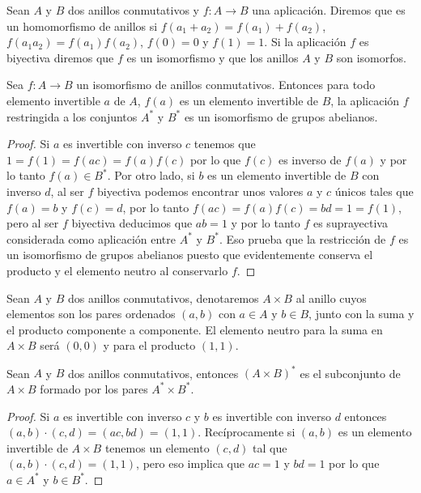 \begin{definition}
Sean $A$ y $B$ dos anillos conmutativos y $f:A \to B$ una aplicaci\'on.
Diremos que es un homomorfismo de anillos si $f(a_1 + a_2) = f(a_1) +
f(a_2)$, $f(a_1 a_2) = f(a_1) f(a_2)$, $f(0) = 0$ y $f(1) = 1$. Si la
aplicaci\'on $f$ es biyectiva diremos que $f$ es un isomorfismo y que los
anillos $A$ y $B$ son isomorfos.
\end{definition}

\begin{proposition}
Sea $f:A \to B$ un isomorfismo de anillos conmutativos. Entonces para todo
elemento invertible $a$ de $A$, $f(a)$ es un elemento invertible de $B$, la
aplicaci\'on $f$ restringida a los conjuntos $A^*$ y $B^*$ es un isomorfismo
de grupos abelianos.
\end{proposition}
\begin{proof}
Si $a$ es invertible con inverso $c$ tenemos que $1 = f(1) = f(ac) =
f(a)f(c)$ por lo que $f(c)$ es inverso de $f(a)$ y por lo tanto $f(a) \in
B^*$. Por otro lado, si $b$ es un elemento invertible de $B$ con inverso
$d$, al ser $f$ biyectiva podemos encontrar unos valores $a$ y $c$ \'unicos
tales que $f(a) = b$ y $f(c) = d$, por lo tanto $f(ac) = f(a)f(c) = bd = 1 =
f(1)$, pero al ser $f$ biyectiva deducimos que $ab = 1$ y por lo tanto $f$
es suprayectiva considerada como aplicaci\'on entre $A^*$ y $B^*$. Eso
prueba que la restricci\'on de $f$ es un isomorfismo de grupos abelianos puesto que
evidentemente conserva el producto y el elemento neutro al conservarlo $f$.
\end{proof}

\begin{definition}
Sean $A$ y $B$ dos anillos conmutativos, denotaremos $A \times B$ al anillo
cuyos elementos son los pares ordenados $(a,b)$ con $a \in A$ y $b \in B$,
junto con la suma y el producto componente a componente. El elemento neutro
para la suma en $A \times B$ ser\'a $(0,0)$ y para el producto $(1,1)$.
\end{definition}

\begin{proposition}
Sean $A$ y $B$ dos anillos conmutativos, entonces $(A\times B)^*$ es el
subconjunto de $A \times B$ formado por los pares $A^* \times B^*$.
\end{proposition}
\begin{proof}
Si $a$ es invertible con inverso $c$ y $b$ es invertible con inverso $d$
entonces $(a,b)\cdot(c,d) = (ac,bd) = (1,1)$. Rec\'iprocamente si $(a,b)$ es
un elemento invertible de $A \times B$ tenemos un elemento $(c,d)$ tal que
$(a,b)\cdot(c,d) = (1,1)$, pero eso implica que $ac = 1$ y $bd = 1$ por lo
que $a \in A^*$ y $b \in B^*$.
\end{proof}

